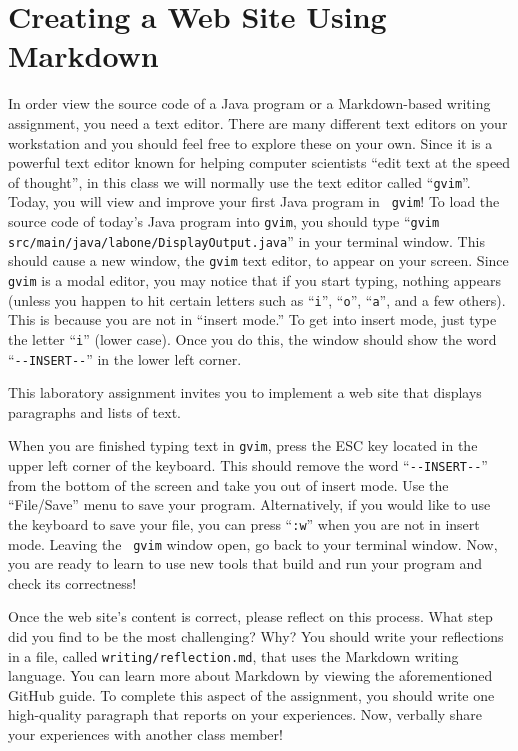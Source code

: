 \documentclass[11pt]{article}
\newcommand{\reflection}{\lstinline{writing/reflection.md}}
\newcommand{\command}[1]{``\lstinline{#1}''}
\newcommand{\program}[1]{\lstinline{#1}}
\newcommand{\option}[1]{``{#1}''}
\begin{document}
\section*{Creating a Web Site Using Markdown}

In order view the source code of a Java program or a Markdown-based writing assignment, you need a text editor. There
are many different text editors on your workstation and you should feel free to explore these on your own. Since it is a
powerful text editor known for helping computer scientists ``edit text at the speed of thought'', in this class we will
normally use the text editor called \command{gvim}. Today, you will view and improve your first Java program in {\tt
  gvim}! To load the source code of today's Java program into \program{gvim}, you should type \command{gvim
src/main/java/labone/DisplayOutput.java} in your terminal window. This should cause a new window, the \program{gvim}
text editor, to appear on your screen. Since \program{gvim} is a modal editor, you may notice that if you start typing,
nothing appears (unless you happen to hit certain letters such as \command{i}, \command{o}, \command{a}, and a few
others). This is because you are not in ``insert mode.'' To get into insert mode, just type the letter \command{i}
(lower case). Once you do this, the window should show the word \command{--INSERT--} in the lower left corner.

This laboratory assignment invites you to implement a web site that displays paragraphs and lists of text.

When you are finished typing text in \program{gvim}, press the ESC key located
in the upper left corner of the keyboard. This should remove the word \command{--INSERT--} from the bottom of the screen
and take you out of insert mode. Use the \option{File/Save} menu to save your program. Alternatively, if you would like
to use the keyboard to save your file, you can press \command{:w} when you are not in insert mode. Leaving the {\tt
gvim} window open, go back to your terminal window. Now, you are ready to learn to use new tools that build and run your
program and check its correctness!

Once the web site's content is correct, please reflect on this process. What step did you find to be the most
challenging? Why? You should write your reflections in a file, called \reflection{}, that uses the Markdown writing
language. You can learn more about Markdown by viewing the aforementioned GitHub guide. To complete this aspect of the
assignment, you should write one high-quality paragraph that reports on your experiences. Now, verbally share your
experiences with another class member!
\end{document}
